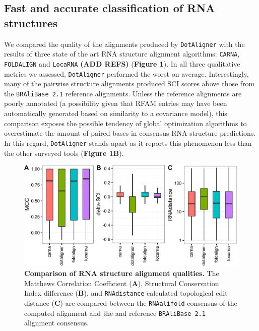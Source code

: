 \documentclass[a4paper,11pt]{article}
\newcommand\dotaligner{\texttt{DotAligner}}
\newcommand\bralibase{\texttt{BRAliBase 2.1}}
\newcommand\locarna{\texttt{LocaRNA}}
\newcommand\foldalign{\texttt{FOLDALIGN}}
\newcommand\carna{\texttt{CARNA}}
\newcommand\rnaalifold{\texttt{RNAalifold}}
\begin{document}
\subsection*{ Fast and accurate classification of RNA structures  } 
We compared the quality of the alignments produced by \dotaligner{} with the results of
three state of the art RNA structure alignment algorithms: \carna{}, \foldalign{} and \locarna{} \textbf{(ADD REFS)}
(\textbf{Figure 1}). In all three qualitative metrics we assessed,  \dotaligner{} performed the 
worst on average. Interestingly, many of the pairwise structure alignments produced 
SCI scores above those from the \bralibase{} reference alignments. Unless the reference
alignments are poorly annotated (a possibility given that RFAM entries may have been automatically 
generated based on similarity to a covariance model), this comparison exposes the possible 
tendency of global optimization algorithms to overestimate the amount of paired bases in 
consensus RNA structure predictions. In this regard, \dotaligner{} stands apart as it reports this 
phenomenon less than the other surveyed tools (\textbf{Figure 1B}). \\

\begin{figure}
 \includegraphics[width=\textwidth]{fig1}
 \caption {\textbf{Comparison of RNA structure alignment qualities.}  The Matthews Correlation Coefficient (\textbf{A}), Structural Conservation Index difference (\textbf{B}), and \texttt{RNAdistance} calculated topological edit distance (\textbf{C}) are compared between the \rnaalifold{} consensus of the computed alignment 
 and the and reference \bralibase{} alignment consensus.  }
\end{figure}
\end{document}
